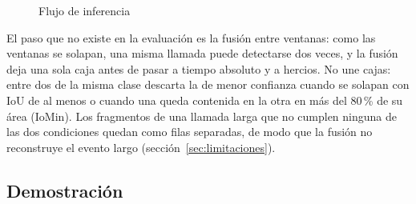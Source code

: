 \begin{figure}[htbp]
    \centering
    \caption{Flujo de inferencia}
    \label{fig:flujo-inferencia}
\end{figure}

El paso que no existe en la evaluación es la fusión entre ventanas: como las
ventanas se solapan, una misma llamada puede detectarse dos veces, y la fusión
deja una sola caja antes de pasar a tiempo absoluto y a hercios. No une cajas:
entre dos de la misma clase descarta la de menor confianza cuando se solapan con
IoU de al menos \mNmsIou{} o cuando una queda contenida en la otra en más del
80\,\% de su área (IoMin). Los fragmentos de una llamada larga que no cumplen
ninguna de las dos condiciones quedan como filas separadas, de modo que la
fusión no reconstruye el evento largo (sección~\ref{sec:limitaciones}).

\subsection{Demostración}
\label{sec:demo-oe2}

